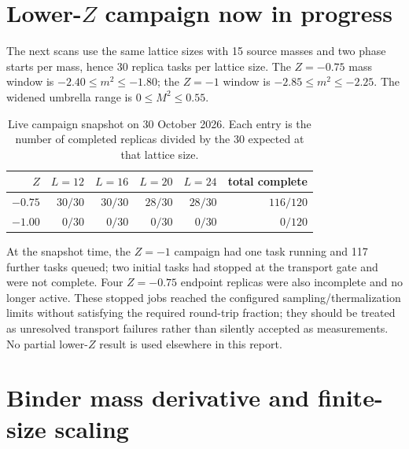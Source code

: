\documentclass[11pt]{article}
\begin{document}
\section{Lower-$Z$ campaign now in progress}

The next scans use the same lattice sizes with 15 source masses and two phase
starts per mass, hence 30 replica tasks per lattice size.  The $Z=-0.75$ mass
window is $-2.40\leq m^2\leq-1.80$; the $Z=-1$ window is
$-2.85\leq m^2\leq-2.25$.  The widened umbrella range is
$0\leq M^2\leq0.55$.

\begin{table}[ht]
\centering
\caption{Live campaign snapshot on 30 October 2026.  Each entry is the number
of completed replicas divided by the 30 expected at that lattice size.}
\label{tab:live-status}
\begin{tabular}{rrrrrr}
\toprule
$Z$ & $L=12$ & $L=16$ & $L=20$ & $L=24$ & total complete \\
\midrule
$-0.75$ & $30/30$ & $30/30$ & $28/30$ & $28/30$ & $116/120$ \\
$-1.00$ & $0/30$ & $0/30$ & $0/30$ & $0/30$ & $0/120$ \\
\bottomrule
\end{tabular}
\end{table}

At the snapshot time, the $Z=-1$ campaign had one task running and 117 further
tasks queued; two initial tasks had stopped at the transport gate and were not
complete.  Four $Z=-0.75$ endpoint replicas were also incomplete and no longer
active.  These stopped jobs reached the configured sampling/thermalization
limits without satisfying the required round-trip fraction; they should be
treated as unresolved transport failures rather than silently accepted as
measurements.  No partial lower-$Z$ result is used elsewhere in this report.

\section{Binder mass derivative and finite-size scaling}
\end{document}
